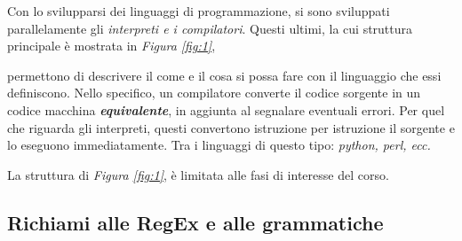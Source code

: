 \documentclass{subfiles}
\begin{document}
Con lo svilupparsi dei linguaggi di programmazione, si sono sviluppati parallelamente gli \emph{interpreti \emph{e i} compilatori}.
Questi ultimi, la cui struttura principale è mostrata in \emph{Figura \ref{fig:1}},

permettono di descrivere il come e il cosa si possa fare con il linguaggio che essi definiscono.
Nello specifico, un compilatore converte il codice sorgente in un codice macchina \emph{\textbf{equivalente}},
in aggiunta al segnalare eventuali errori.
Per quel che riguarda gli interpreti, questi convertono istruzione per istruzione il sorgente e lo eseguono immediatamente.
Tra i linguaggi di questo tipo: \emph{python, perl, ecc.}

\begin{Remark*}
    La struttura di \emph{Figura \ref{fig:1}}, è limitata alle fasi di interesse del corso.
\end{Remark*}

\subsection{Richiami alle RegEx e alle grammatiche}

\clearpage
\end{document}
